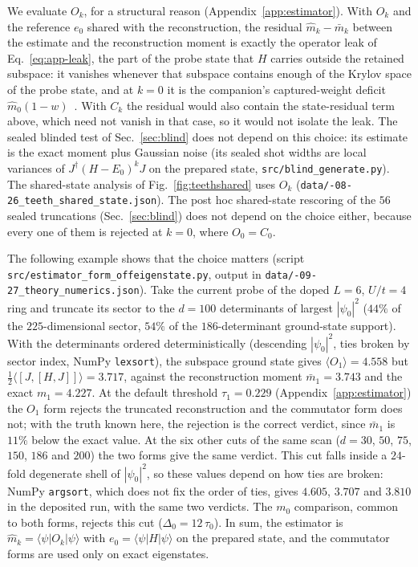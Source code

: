 \documentclass[submission, PhysCore]{SciPost}
\begin{document}
\begin{appendix}
We evaluate $O_k$, for a structural reason (Appendix~\ref{app:estimator}). With $O_k$ and the reference $e_0$ shared with the reconstruction, the residual $\widehat m_k-\bar m_k$ between the estimate and the reconstruction moment is exactly the operator leak of Eq.~\eqref{eq:app-leak}, the part of the probe state that $H$ carries outside the retained subspace: it vanishes whenever that subspace contains enough of the Krylov space of the probe state, and at $k=0$ it is the companion's captured-weight deficit $\widehat m_0(1-w)$~\cite{SQDspec2608}. With $C_k$ the residual would also contain the state-residual term above, which need not vanish in that case, so it would not isolate the leak. The sealed blinded test of Sec.~\ref{sec:blind} does not depend on this choice: its estimate is the exact moment plus Gaussian noise (its sealed shot widths are local variances of $J^\dagger(H-E_0)^kJ$ on the prepared state, \texttt{src/\allowbreak blind\_generate.py}). The shared-state analysis of Fig.~\ref{fig:teethshared} uses $O_k$ (\texttt{data/-08-26\_teeth\_shared\_state.json}). The post hoc shared-state rescoring of the $56$ sealed truncations (Sec.~\ref{sec:blind}) does not depend on the choice either, because every one of them is rejected at $k=0$, where $O_0=C_0$.

The following example shows that the choice matters (script \texttt{src/\allowbreak estimator\_form\_\allowbreak offeigenstate.py}, output in \texttt{data/-09-27\_theory\_numerics.json}). Take the current probe of the doped $L=6$, $U/t=4$ ring and truncate its sector to the $d=100$ determinants of largest $|\psi_0|^2$ ($44\%$ of the $225$-dimensional sector, $54\%$ of the $186$-determinant ground-state support). With the determinants ordered deterministically (descending $|\psi_0|^2$, ties broken by sector index, NumPy \texttt{lexsort}), the subspace ground state gives $\langle O_1\rangle=4.558$ but $\tfrac12\langle[J,[H,J]]\rangle=3.717$, against the reconstruction moment $\bar m_1=3.743$ and the exact $m_1=4.227$. At the default threshold $\tau_1=0.229$ (Appendix~\ref{app:estimator}) the $O_1$ form rejects the truncated reconstruction and the commutator form does not; with the truth known here, the rejection is the correct verdict, since $\bar m_1$ is $11\%$ below the exact value. At the six other cuts of the same scan ($d=30$, $50$, $75$, $150$, $186$ and $200$) the two forms give the same verdict. This cut falls inside a $24$-fold degenerate shell of $|\psi_0|^2$, so these values depend on how ties are broken: NumPy \texttt{argsort}, which does not fix the order of ties, gives $4.605$, $3.707$ and $3.810$ in the deposited run, with the same two verdicts. The $m_0$ comparison, common to both forms, rejects this cut ($\Delta_0=12\,\tau_0$). In sum, the estimator is $\widehat m_k=\langle\psi|O_k|\psi\rangle$ with $e_0=\langle\psi|H|\psi\rangle$ on the prepared state, and the commutator forms are used only on exact eigenstates.


\end{appendix}
\end{document}
